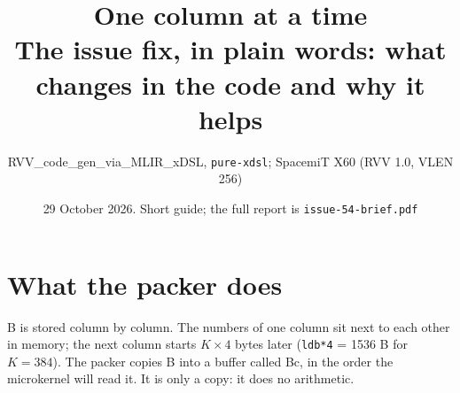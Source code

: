 
\graphicspath{{issue-54-figs/simple/en/}}
\title{\vspace{-1.2cm}\textbf{One column at a time}\\[2pt]\large The issue  fix, in plain words: what changes in the code and why it helps}
\author{RVV\_code\_gen\_via\_MLIR\_xDSL, \texttt{pure-xdsl}; SpacemiT X60 (RVV 1.0, VLEN 256)}
\date{29 October 2026. Short guide; the full report is \texttt{issue-54-brief.pdf}}

\maketitle\vspace{-1.5ex}


\section{What the packer does}
B is stored column by column. The numbers of one column sit next to each other in memory; the next column starts $K\times4$ bytes
later (\texttt{ldb*4} = 1536 B for $K=384$). The packer copies B into a buffer called Bc, in the order the microkernel will read it. It is
only a copy: it does no arithmetic.

